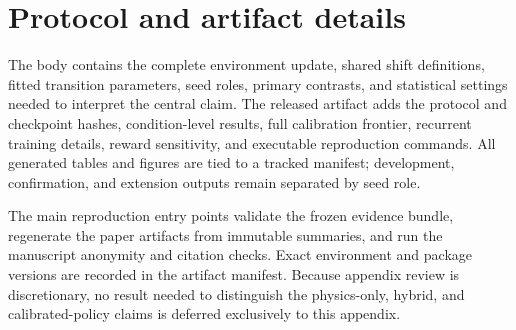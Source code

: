 \section{Protocol and artifact details}
\label{app:protocol}

The body contains the complete environment update, shared shift definitions,
fitted transition parameters, seed roles, primary contrasts, and statistical
settings needed to interpret the central claim. The released artifact adds the
protocol and checkpoint hashes, condition-level results, full calibration
frontier, recurrent training details, reward sensitivity, and executable
reproduction commands. All generated tables and figures are tied to a tracked
manifest; development, confirmation, and extension outputs remain separated by
seed role.

The main reproduction entry points validate the frozen evidence bundle,
regenerate the paper artifacts from immutable summaries, and run the manuscript
anonymity and citation checks. Exact environment and package versions are
recorded in the artifact manifest. Because appendix review is discretionary,
no result needed to distinguish the physics-only, hybrid, and calibrated-policy
claims is deferred exclusively to this appendix.
